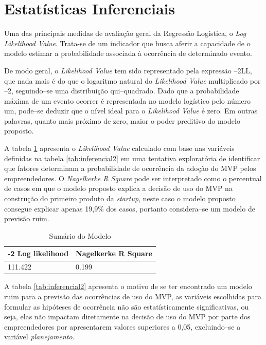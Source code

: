 \section{Estat\'isticas Inferenciais}

Uma das principais medidas de avalia\c{c}\~ao geral da Regress\~ao Log\'istica, o \emph{Log Likelihood Value}. Trata-se de um indicador que busca aferir a capacidade de o modelo estimar a probabilidade associada \`a ocorr\^encia de determinado evento.

De modo geral, o \emph{Likelihood Value} tem sido representado pela express\~ao --2LL, que nada mais \'e do que o logaritmo natural do \emph{Likelihood Value} multiplicado por --2, seguindo--se uma distribui\c{c}\~ao qui--quadrado. Dado que a probabilidade m\'axima de um evento ocorrer \'e representada no modelo log\'istico pelo n\'umero um, pode--se deduzir que o n\'ivel ideal para o \emph{Likelihood Value} \'e zero. Em outras palavras, quanto mais pr\'oximo de zero, maior o poder preditivo do modelo proposto.

A tabela \ref{tab:cap4inf1} apresenta o \emph{Likelihood Value} calculado com base nas vari\'aveis definidas na tabela \ref{tab:inferencial2} em uma tentativa explorat\'oria de identificar que fatores determinam a probabilidade de ocorr\^encia da ado\c{c}\~ao do MVP pelos empreendedores. O \emph{Nagelkerke R Square} pode ser interpretado como o percentual de casos em que o modelo proposto explica a decis\~ao de uso do MVP na constru\c{c}\~ao do primeiro produto da \emph{startup}, neste caso o modelo proposto consegue explicar apenas 19,9\% dos casos, portanto considera--se um modelo de previs\~ao ruim.

\begin{table}[hb]
\centering
\caption{Sum\'ario do Modelo}
\label{tab:cap4inf1}
\begin{tabular}{|p{5cm}|p{5cm}|}
\hline{\bf -2 Log likelihood} & {\bf Nagelkerke R Square}\\
\hline 111.422 & 0.199\\
\hline
\end{tabular}
\end{table}

A tabela \ref{tab:inferencial2} apresenta o motivo de se ter encontrado um modelo ruim para a previs\~ao das ocorr\^encias de uso do MVP, as vari\'aveis escolhidas para formular as hip\'oteses de ocorr\^encia n\~ao s\~ao estat\'isticamente significativas, ou seja, elas n\~ao impactam diretamente na decis\~ao de uso do MVP por parte dos empreendedores por apresentarem valores superiores a 0,05, excluindo--se a vari\'avel \emph{planejamento}.

